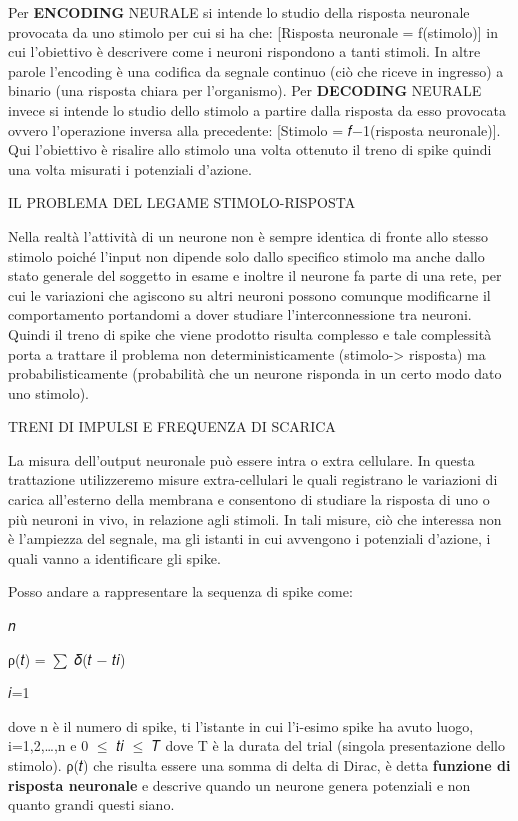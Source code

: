 \documentclass[12pt,a4paper]{book}
\begin{document}
Per \textbf{ENCODING }NEURALE si intende lo studio della risposta neuronale provocata da uno stimolo per cui si ha che: [Risposta neuronale = f(stimolo)] in cui l'obiettivo è descrivere come i neuroni rispondono a tanti stimoli. In altre parole l'encoding è una codifica da segnale continuo (ciò che riceve in ingresso) a binario (una risposta chiara per l'organismo). Per \textbf{DECODING }NEURALE invece si intende lo studio dello stimolo a partire dalla risposta da esso provocata ovvero l'operazione inversa alla precedente: [Stimolo = 𝑓−1(risposta neuronale)]. Qui l'obiettivo è risalire allo stimolo una volta ottenuto il treno di spike quindi una volta misurati i potenziali d'azione.

IL PROBLEMA DEL LEGAME STIMOLO-RISPOSTA

Nella realtà l'attività di un neurone non è sempre identica di fronte allo stesso stimolo poiché l'input non dipende solo dallo specifico stimolo ma anche dallo stato generale del soggetto in esame e inoltre il neurone fa parte di una rete, per cui le variazioni che agiscono su altri neuroni possono comunque modificarne il comportamento portandomi a dover studiare l'interconnessione tra neuroni. Quindi il treno di spike che viene prodotto risulta complesso e tale complessità porta a trattare il problema non deterministicamente (stimolo-> risposta) ma probabilisticamente (probabilità che un neurone risponda in un certo modo dato uno stimolo).

TRENI DI IMPULSI E FREQUENZA DI SCARICA

La misura dell'output neuronale può essere intra o extra cellulare. In questa trattazione utilizzeremo misure extra-cellulari le quali registrano le variazioni di carica all'esterno della membrana e consentono di studiare la risposta di uno o più neuroni in vivo, in relazione agli stimoli. In tali misure, ciò che interessa non è l'ampiezza del segnale, ma gli istanti in cui avvengono i potenziali d'azione, i quali vanno a identificare gli spike.

Posso andare a rappresentare la sequenza di spike come:

𝑛

ρ(𝑡) = $\sum$ 𝛿(𝑡 − 𝑡𝑖)

𝑖=1

dove n è il numero di spike, ti l'istante in cui l'i-esimo spike ha avuto luogo, i=1,2,…,n e 0 $\leq$ 𝑡𝑖 $\leq$ 𝑇 dove T è la durata del trial (singola presentazione dello stimolo). ρ(𝑡) che risulta essere una somma di delta di Dirac, è detta \textbf{funzione di risposta neuronale }e descrive quando un neurone genera potenziali e non quanto grandi questi siano.
\end{document}
